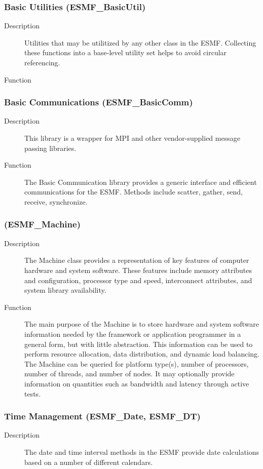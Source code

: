 \subsubsection{Basic Utilities (ESMF\_BasicUtil)} 
\begin{description}
\item [Description] Utilities that may be utilitized by any other class in the ESMF.  
Collecting these functions into a base-level utility set helps to 
avoid circular referencing.
\item [Function] 
\end{description}

\subsubsection{Basic Communications (ESMF\_BasicComm)}
\begin{description}
\item [Description] This library is a wrapper for MPI and other vendor-supplied 
message passing libraries.
\item [Function] The Basic Communication library provides a generic interface
and efficient communications for the ESMF.  Methods include scatter, gather, send,
receive, synchronize. 
\end{description}

\subsubsection{ (ESMF\_Machine)} 
\begin{description}
\item [Description] The Machine class provides a representation of 
key features of computer hardware and system software.  These
features include memory attributes and configuration, processor type and speed,
interconnect attributes, and system library availability.
\item [Function]
The main purpose of the Machine is to store hardware and system software
information needed by the framework or application programmer in a general
form, but with little abstraction.  This information can be used to perform resource 
allocation, data distribution, and dynamic load balancing.  The Machine can be queried
for platform type(s), number of processors, number of threads, and number of 
nodes.  It may optionally provide information on quantities such as bandwidth and 
latency through active tests.  
\end{description}

\subsubsection{Time Management (ESMF\_Date, ESMF\_DT)}
\begin{description}
\item [Description] The date and time interval methods in the ESMF provide date
calculations based on a number of different calendars.

\end{description}
















